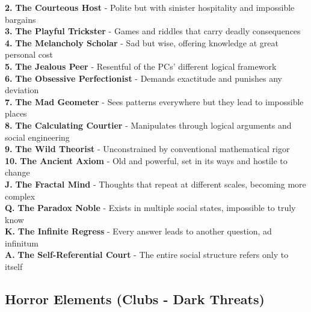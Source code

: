 \documentclass[11pt]{article}
\begin{document}
\textbf{2.} \textbf{The Courteous Host} - Polite but with sinister hospitality and impossible bargains \\
\textbf{3.} \textbf{The Playful Trickster} - Games and riddles that carry deadly consequences \\
\textbf{4.} \textbf{The Melancholy Scholar} - Sad but wise, offering knowledge at great personal cost \\
\textbf{5.} \textbf{The Jealous Peer} - Resentful of the PCs' different logical framework \\
\textbf{6.} \textbf{The Obsessive Perfectionist} - Demands exactitude and punishes any deviation \\
\textbf{7.} \textbf{The Mad Geometer} - Sees patterns everywhere but they lead to impossible places \\
\textbf{8.} \textbf{The Calculating Courtier} - Manipulates through logical arguments and social engineering \\
\textbf{9.} \textbf{The Wild Theorist} - Unconstrained by conventional mathematical rigor \\
\textbf{10.} \textbf{The Ancient Axiom} - Old and powerful, set in its ways and hostile to change \\
\textbf{J.} \textbf{The Fractal Mind} - Thoughts that repeat at different scales, becoming more complex \\
\textbf{Q.} \textbf{The Paradox Noble} - Exists in multiple social states, impossible to truly know \\
\textbf{K.} \textbf{The Infinite Regress} - Every answer leads to another question, ad infinitum \\
\textbf{A.} \textbf{The Self-Referential Court} - The entire social structure refers only to itself

\subsection*{Horror Elements (Clubs - Dark Threats)}
\end{document}
